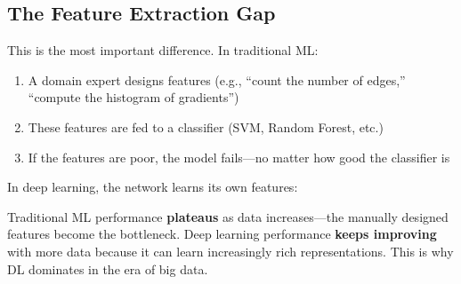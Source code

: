 \documentclass[11pt,a4paper]{article}
\begin{document}
\subsection{The Feature Extraction Gap}

This is the most important difference. In traditional ML:

\begin{enumerate}[leftmargin=1.5em]
    \item A domain expert designs features (e.g., ``count the number of edges,'' ``compute the histogram of gradients'')
    \item These features are fed to a classifier (SVM, Random Forest, etc.)
    \item If the features are poor, the model fails---no matter how good the classifier is
\end{enumerate}

In deep learning, the network learns its own features:

\begin{center}
\end{center}

\begin{tcolorbox}[intuitionbox={Performance Scaling}]
Traditional ML performance \textbf{plateaus} as data increases---the manually designed features become the bottleneck. Deep learning performance \textbf{keeps improving} with more data because it can learn increasingly rich representations. This is why DL dominates in the era of big data.
\end{tcolorbox}
\end{document}
